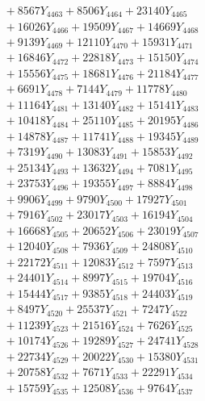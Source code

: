 \documentclass[a4paper,10pt]{article}
\begin{document}
{\begin{align}
&\;  + 8567 Y_{4463} + 8506 Y_{4464} + 23140 Y_{4465} \\[0.3ex]
&\;  + 16026 Y_{4466} + 19509 Y_{4467} + 14669 Y_{4468} \\[0.5ex]\allowbreak
&\;  + 9139 Y_{4469} + 12110 Y_{4470} + 15931 Y_{4471} \\[0.3ex]
&\;  + 16846 Y_{4472} + 22818 Y_{4473} + 15150 Y_{4474} \\[0.3ex]
&\;  + 15556 Y_{4475} + 18681 Y_{4476} + 21184 Y_{4477} \\[0.3ex]
&\;  + 6691 Y_{4478} + 7144 Y_{4479} + 11778 Y_{4480} \\[0.3ex]
&\;  + 11164 Y_{4481} + 13140 Y_{4482} + 15141 Y_{4483} \\[0.3ex]
&\;  + 10418 Y_{4484} + 25110 Y_{4485} + 20195 Y_{4486} \\[0.3ex]
&\;  + 14878 Y_{4487} + 11741 Y_{4488} + 19345 Y_{4489} \\[0.3ex]
&\;  + 7319 Y_{4490} + 13083 Y_{4491} + 15853 Y_{4492} \\[0.3ex]
&\;  + 25134 Y_{4493} + 13632 Y_{4494} + 7081 Y_{4495} \\[0.3ex]
&\;  + 23753 Y_{4496} + 19355 Y_{4497} + 8884 Y_{4498} \\[0.5ex]\allowbreak
&\;  + 9906 Y_{4499} + 9790 Y_{4500} + 17927 Y_{4501} \\[0.3ex]
&\;  + 7916 Y_{4502} + 23017 Y_{4503} + 16194 Y_{4504} \\[0.3ex]
&\;  + 16668 Y_{4505} + 20652 Y_{4506} + 23019 Y_{4507} \\[0.3ex]
&\;  + 12040 Y_{4508} + 7936 Y_{4509} + 24808 Y_{4510} \\[0.3ex]
&\;  + 22172 Y_{4511} + 12083 Y_{4512} + 7597 Y_{4513} \\[0.3ex]
&\;  + 24401 Y_{4514} + 8997 Y_{4515} + 19704 Y_{4516} \\[0.3ex]
&\;  + 15444 Y_{4517} + 9385 Y_{4518} + 24403 Y_{4519} \\[0.3ex]
&\;  + 8497 Y_{4520} + 25537 Y_{4521} + 7247 Y_{4522} \\[0.3ex]
&\;  + 11239 Y_{4523} + 21516 Y_{4524} + 7626 Y_{4525} \\[0.3ex]
&\;  + 10174 Y_{4526} + 19289 Y_{4527} + 24741 Y_{4528} \\[0.5ex]\allowbreak
&\;  + 22734 Y_{4529} + 20022 Y_{4530} + 15380 Y_{4531} \\[0.3ex]
&\;  + 20758 Y_{4532} + 7671 Y_{4533} + 22291 Y_{4534} \\[0.3ex]
&\;  + 15759 Y_{4535} + 12508 Y_{4536} + 9764 Y_{4537} \\[0.3ex]

\end{align}}
\end{document}
